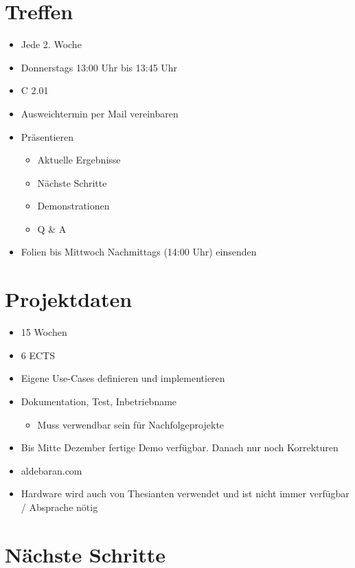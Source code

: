 \documentclass[a4paper,DIV=9,12pt]{scrreprt}
\begin{document}
\chapter{Treffen}

\begin{itemize}
    \item Jede 2. Woche
    \item Donnerstags 13:00 Uhr bis 13:45 Uhr
    \item C 2.01
    \item Ausweichtermin per Mail vereinbaren
    \item Präsentieren
        \begin{itemize}
            \item Aktuelle Ergebnisse
            \item Nächste Schritte
            \item Demonstrationen
            \item Q \& A
        \end{itemize}
    \item Folien bis Mittwoch Nachmittags (14:00 Uhr) einsenden
\end{itemize}

\chapter{Projektdaten}

\begin{itemize}
    \item 15 Wochen
    \item 6 ECTS
    \item Eigene Use-Cases definieren und implementieren
    \item Dokumentation, Test, Inbetriebname
        \begin{itemize}
            \item Muss verwendbar sein für Nachfolgeprojekte
        \end{itemize}
    \item Bis Mitte Dezember fertige Demo verfügbar. Danach nur noch Korrekturen
    \item aldebaran.com
    \item Hardware wird auch von Thesianten verwendet und ist nicht immer
        verfügbar / Absprache nötig
\end{itemize}

\chapter{Nächste Schritte}
\end{document}
